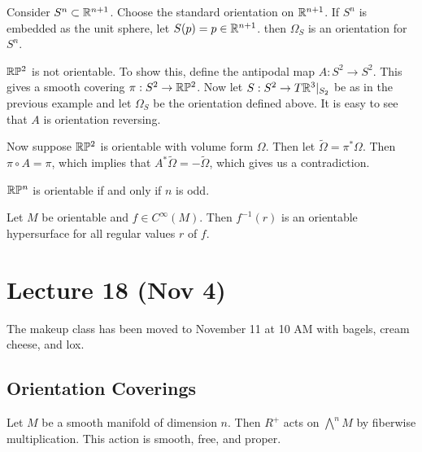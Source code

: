 \documentclass[twoside, 10pt]{article}
\begin{document}
    \begin{exm}
        Consider $S^n \subset \mathbb{R}^{n+1}$. Choose the standard orientation on $\mathbb{R}^{n+1}$. If $S^n$ is embedded as the unit sphere, let $S(p) = p \in \mathbb{R}^{n+1}$. then $\Omega_S$ is an orientation for $S^n$.
    \end{exm}

    \begin{exm}
        $\mathbb{R}\mathbb{P}^2$ is not orientable. To show this, define the antipodal map $A: S^2 \to S^2$. This gives a smooth covering $\pi: S^2 \to \mathbb{R}\mathbb{P}^2$. Now let $S: S^2 \to T\mathbb{R}^3|_{S_2}$ be as in the previous example and let $\Omega_S$ be the orientation defined above. It is easy to see that $A$ is orientation reversing. 

        Now suppose $\mathbb{R}\mathbb{P}^2$ is orientable with volume form $\Omega$. Then let $\widetilde{\Omega} = \pi^*\Omega$. Then $\pi \circ A = \pi$, which implies that $A^*\widetilde{\Omega} = - \widetilde{\Omega}$, which gives us a contradiction.
    \end{exm}

    \begin{exer}[Homework]
        $\mathbb{R}\mathbb{P}^n$ is orientable if and only if $n$ is odd.
    \end{exer}

    \begin{exm}
        Let $M$ be orientable and $f \in C^{\infty}(M)$. Then $f^{-1}(r)$ is an orientable hypersurface for all regular values $r$ of $f$.
    \end{exm}

    \section{Lecture 18 (Nov 4)}%
    \label{sec:lecture_18_nov_4_}
    
    The makeup class has been moved to November 11 at 10 AM with bagels, cream cheese, and lox.

    \subsection{Orientation Coverings}%
    \label{sub:orientation_coverings}
    
    \begin{lem}
        Let $M$ be a smooth manifold of dimension $n$. Then $R^{+}$ acts on $\bigwedge^n M$ by fiberwise multiplication. This action is smooth, free, and proper.
    \end{lem}
\end{document}
